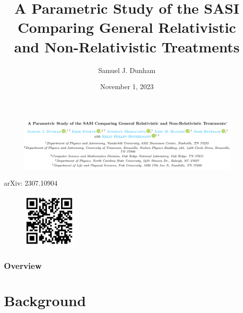 \documentclass{beamer}
\title[Vanderbilt AJRC]{A Parametric Study of the SASI Comparing
General Relativistic and Non-Relativistic Treatments}
\author{Samuel J. Dunham}
\date{November 1, 2023}
\begin{document}
\begin{frame}

  \titlepage

\end{frame}

\begin{frame}

  \begin{figure}[htb!]
    \centering
    \includegraphics[width=\textwidth]{fig.paperTitle.png}
  \end{figure}

  \centerline{arXiv: 2307.10904}
  \begin{figure}[htb!]
    \centering
    \includegraphics[width=0.25\textwidth]{fig.arxivLink.png}
  \end{figure}

\end{frame}



\begin{frame}
\frametitle{Overview}

  \tableofcontents

\end{frame}


\section{Background}
\end{document}
